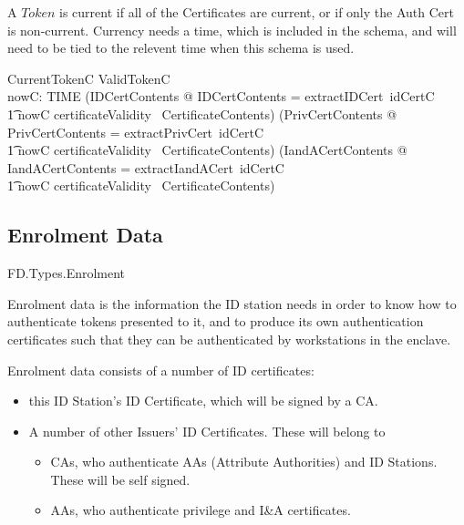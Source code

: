 A $Token$ is current if all of the Certificates are current,
or if only the Auth Cert is non-current.
Currency needs a time, which is included in the schema,
and will need to be tied to the relevent time when this schema is used.

\begin{schema}{CurrentTokenC}
	ValidTokenC
\\	nowC: TIME
\where
        (\exists IDCertContents @ \theta IDCertContents =
        extractIDCert~idCertC
\\ \t1  \land nowC \in certificateValidity~ \theta CertificateContents) 
\also
        (\exists PrivCertContents @ \theta PrivCertContents =
        extractPrivCert~idCertC
\\ \t1  \land nowC \in certificateValidity~ \theta CertificateContents) 
\also
        (\exists IandACertContents @ \theta IandACertContents =
        extractIandACert~idCertC
\\ \t1  \land nowC \in certificateValidity~ \theta CertificateContents) 
\end{schema}

\subsection{Enrolment Data}

\begin{traceunit}{FD.Types.Enrolment}
\end{traceunit}
Enrolment data is the information the ID station needs in order to
know how to authenticate tokens presented to it, and to produce its
own authentication certificates such that they can be authenticated by
workstations in the enclave.

Enrolment data consists of a number of ID certificates: 
\begin{itemize}
\item
this ID Station's ID Certificate, which will be signed by a CA.
\item
A number of other Issuers' ID Certificates. These will belong to 
        \begin{itemize}
        \item
        CAs, who authenticate AAs (Attribute Authorities) and ID Stations. These will be self signed.
        \item
        AAs, who authenticate privilege and I\&A certificates. 
        \end{itemize}
\end{itemize}

